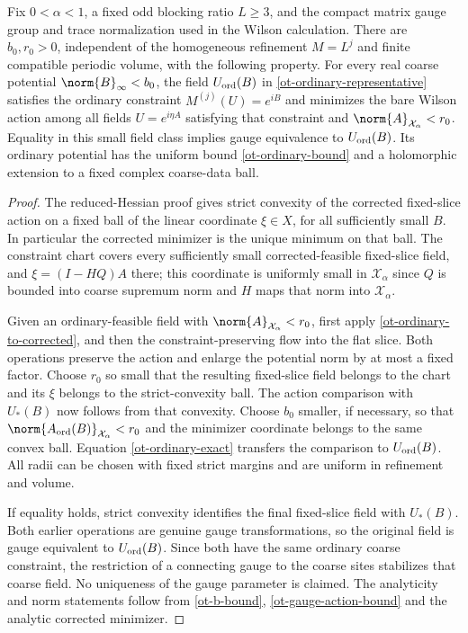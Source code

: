 \begin{theorem}
\label{ot-minimum}
Fix $0<\alpha<1$, a fixed odd blocking ratio $L\ge3$,
and the compact matrix gauge group and trace normalization
used in the Wilson calculation. There are $b_0,r_0>0$,
independent of the homogeneous refinement $M=L^j$ and
finite compatible periodic volume, with the following
property. For every real coarse potential
$\norm{B}_\infty<b_0$, the field $U_{\rm ord}(B)$ in
\eqref{ot-ordinary-representative} satisfies the ordinary
constraint $M^{(j)}(U)=e^{iB}$ and minimizes the bare Wilson
action among all fields $U=e^{i\eta A}$ satisfying that
constraint and $\norm{A}_{\mathcal X_\alpha}<r_0$.
Equality in this small field class implies gauge equivalence
to $U_{\rm ord}(B)$. Its ordinary potential has the uniform
bound \eqref{ot-ordinary-bound} and a holomorphic extension
to a fixed complex coarse-data ball.
\end{theorem}

\begin{proof}
The reduced-Hessian proof gives strict convexity of the
corrected fixed-slice action on a fixed ball of the linear
coordinate $\xi\in X$, for all sufficiently small $B$.
In particular the corrected minimizer is the unique minimum
on that ball. The constraint chart covers every sufficiently
small corrected-feasible fixed-slice field, and
$\xi=(I-HQ)A$ there; this coordinate is uniformly small in
$\mathcal X_\alpha$ since $Q$ is bounded into coarse
supremum norm and $H$ maps that norm into
$\mathcal X_\alpha$.

Given an ordinary-feasible field with
$\norm{A}_{\mathcal X_\alpha}<r_0$, first apply
\eqref{ot-ordinary-to-corrected}, and then the
constraint-preserving flow into the flat slice. Both
operations preserve the action and enlarge the potential
norm by at most a fixed factor. Choose $r_0$ so small that
the resulting fixed-slice field belongs to the chart and
its $\xi$ belongs to the strict-convexity ball. The action
comparison with $U_*(B)$ now follows from that convexity.
Choose $b_0$ smaller, if necessary, so that
$\norm{A_{\rm ord}(B)}_{\mathcal X_\alpha}<r_0$ and the
minimizer coordinate belongs to the same convex ball.
Equation \eqref{ot-ordinary-exact} transfers the comparison
to $U_{\rm ord}(B)$. All radii can be chosen with fixed
strict margins and are uniform in refinement and volume.

If equality holds, strict convexity identifies the final
fixed-slice field with $U_*(B)$. Both earlier operations
are genuine gauge transformations, so the original field
is gauge equivalent to $U_{\rm ord}(B)$. Since both have
the same ordinary coarse constraint, the restriction of
a connecting gauge to the coarse sites stabilizes that
coarse field. No uniqueness of the gauge parameter is
claimed. The analyticity and norm statements follow from
\eqref{ot-b-bound}, \eqref{ot-gauge-action-bound} and the
analytic corrected minimizer.
\end{proof}

